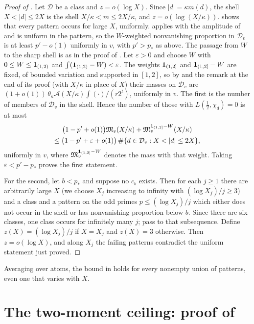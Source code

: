 \documentclass[11pt,colorlinks]{charlie}
\newcommand{\cD}{\mathcal{D}}
\newcommand{\cA}{\mathcal{A}}
\newcommand{\pstar}{p_\ast}
\begin{document}
\begin{proof}[Proof of ]
Let $\cD$ be a class and $z=o(\log X)$. Since $|d|=\kappa m(d)$, the shell $X<|d|\le2X$ is the shell $X/\kappa<m\le2X/\kappa$, and $z=o(\log(X/\kappa))$.  shows that every pattern occurs for large $X$, uniformly.  applies with the amplitude of  and is uniform in the pattern, so the $W$-weighted nonvanishing proportion in $\cD_v$ is at least $p'-o(1)$ uniformly in $v$, with $p'>\pstar$ as above. The passage from $W$ to the sharp shell is as in the proof of . Let $\varepsilon>0$ and choose $W$ with $0\le W\le\mathbf{1}_{(1,2)}$ and $\int(\mathbf{1}_{(1,2)}-W)<\varepsilon$. The weights $\mathbf{1}_{(1,2]}$ and $\mathbf{1}_{(1,2]}-W$ are fixed, of bounded variation and supported in $[1,2]$, so by  and the remark at the end of its proof (with $X/\kappa$ in place of $X$) their masses on $\cD_v$ are $(1+o(1))\,\theta_\kappa\cA (X/\kappa)\int(\cdot)/(r2^t)$, uniformly in $v$. The first is the number of members of $\cD_v$ in the shell. Hence the number of those with $L(\frac12,\chi_d)=0$ is at most
\begin{multline*}
 \big(1-p'+o(1)\big)\mathfrak M_v(X/\kappa)+\mathfrak M_v^{\one_{(1,2]}-W}(X/\kappa)\\
 \le\big(1-p'+\varepsilon+o(1)\big)\,\#\{d\in\cD_v:X<|d|\le2X\},
\end{multline*}
uniformly in $v$, where $\mathfrak M_v^{\mathbf{1}_{(1,2]}-W}$ denotes the mass with that weight. Taking $\varepsilon<p'-\pstar$ proves the first statement.

For the second, let $b<\pstar$ and suppose no $c_b$ exists. Then for each $j\ge1$ there are arbitrarily large $X$ (we choose $X_j$ increasing to infinity with $(\log X_j)/j\ge3$) and a class and a pattern on the odd primes $p\le(\log X_j)/j$ which either does not occur in the shell or has nonvanishing proportion below $b$. Since there are six classes, one class occurs for infinitely many $j$; pass to that subsequence. Define $z(X)=(\log X_j)/j$ if $X=X_j$ and $z(X)=3$ otherwise. Then $z=o(\log X)$, and along $X_j$ the failing patterns contradict the uniform statement just proved.
\end{proof}

Averaging over atoms, the bound in  holds for every nonempty union of patterns, even one that varies with $X$.

\section{The two-moment ceiling: proof of \texorpdfstring{}{Theorem 3}}\label{sec:twomoment}
\end{document}
